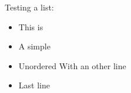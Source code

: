 Testing a list:
\begin{itemize}\item This is
\item A simple
\item Unordered
  With an other line
\item Last line
\end{itemize}
